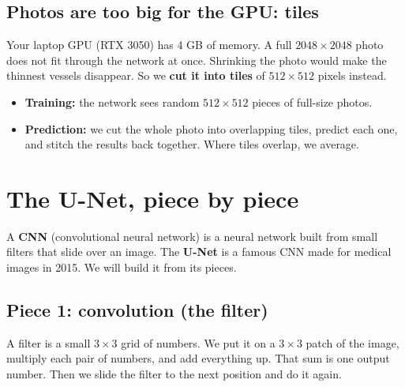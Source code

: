 \documentclass[11pt,a4paper]{article}
\begin{document}
\subsection{Photos are too big for the GPU: tiles}
Your laptop GPU (RTX 3050) has 4 GB of memory. A full $2048\times2048$ photo does not fit through the network at once. Shrinking the photo would make the thinnest vessels disappear. So we \textbf{cut it into tiles} of $512\times512$ pixels instead.
\begin{itemize}
  \item \textbf{Training:} the network sees random $512\times512$ pieces of full-size photos.
  \item \textbf{Prediction:} we cut the whole photo into overlapping tiles, predict each one, and stitch the results back together. Where tiles overlap, we average.
\end{itemize}

\section{The U-Net, piece by piece}

A \textbf{CNN} (convolutional neural network) is a neural network built from small filters that slide over an image. The \textbf{U-Net} is a famous CNN made for medical images in 2015. We will build it from its pieces.

\subsection{Piece 1: convolution (the filter)}
A filter is a small $3\times3$ grid of numbers. We put it on a $3\times3$ patch of the image, multiply each pair of numbers, and add everything up. That sum is one output number. Then we slide the filter to the next position and do it again.
\end{document}
